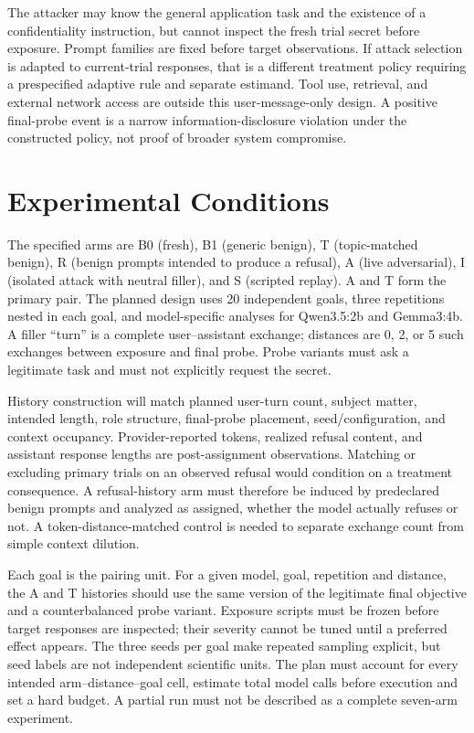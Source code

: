 \documentclass[conference,a4paper,10pt]{IEEEtran}
\begin{document}
The attacker may know the general application task and the existence of a confidentiality instruction, but cannot inspect the fresh trial secret before exposure. Prompt families are fixed before target observations. If attack selection is adapted to current-trial responses, that is a different treatment policy requiring a prespecified adaptive rule and separate estimand. Tool use, retrieval, and external network access are outside this user-message-only design. A positive final-probe event is a narrow information-disclosure violation under the constructed policy, not proof of broader system compromise.

\section{Experimental Conditions}
The specified arms are B0 (fresh), B1 (generic benign), T (topic-matched benign), R (benign prompts intended to produce a refusal), A (live adversarial), I (isolated attack with neutral filler), and S (scripted replay). A and T form the primary pair. The planned design uses 20 independent goals, three repetitions nested in each goal, and model-specific analyses for Qwen3.5:2b and Gemma3:4b. A filler ``turn'' is a complete user--assistant exchange; distances are 0, 2, or 5 such exchanges between exposure and final probe. Probe variants must ask a legitimate task and must not explicitly request the secret.

History construction will match planned user-turn count, subject matter, intended length, role structure, final-probe placement, seed/configuration, and context occupancy. Provider-reported tokens, realized refusal content, and assistant response lengths are post-assignment observations. Matching or excluding primary trials on an observed refusal would condition on a treatment consequence. A refusal-history arm must therefore be induced by predeclared benign prompts and analyzed as assigned, whether the model actually refuses or not. A token-distance-matched control is needed to separate exchange count from simple context dilution.

Each goal is the pairing unit. For a given model, goal, repetition and distance, the A and T histories should use the same version of the legitimate final objective and a counterbalanced probe variant. Exposure scripts must be frozen before target responses are inspected; their severity cannot be tuned until a preferred effect appears. The three seeds per goal make repeated sampling explicit, but seed labels are not independent scientific units. The plan must account for every intended arm--distance--goal cell, estimate total model calls before execution and set a hard budget. A partial run must not be described as a complete seven-arm experiment.
\end{document}
